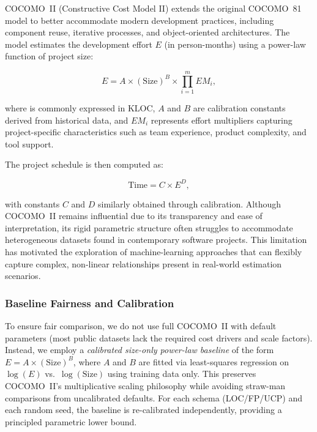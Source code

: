 \documentclass[11pt,a4paper]{article}
\begin{document}
COCOMO~II (Constructive Cost Model II) extends the original COCOMO~81 model to better accommodate modern development practices, including component reuse, iterative processes, and object-oriented architectures. The model estimates the development effort $E$ (in person-months) using a power-law function of project size:

\begin{equation}
E = A \times (\text{Size})^{B} \times \prod_{i=1}^{m} EM_i,
\label{eq:cocomo-effort}
\end{equation}

where  is commonly expressed in KLOC, $A$ and $B$ are calibration constants derived from historical data, and $EM_i$ represents effort multipliers capturing project-specific characteristics such as team experience, product complexity, and tool support.

The project schedule is then computed as:

\begin{equation}
\text{Time} = C \times E^{D},
\label{eq:cocomo-time}
\end{equation}

with constants $C$ and $D$ similarly obtained through calibration. Although COCOMO~II remains influential due to its transparency and ease of interpretation, its rigid parametric structure often struggles to accommodate heterogeneous datasets found in contemporary software projects. This limitation has motivated the exploration of machine-learning approaches that can flexibly capture complex, non-linear relationships present in real-world estimation scenarios.

\subsubsection{Baseline Fairness and Calibration}

To ensure fair comparison, we do not use full COCOMO~II with default parameters (most public datasets lack the required cost drivers and scale factors). Instead, we employ a \textit{calibrated size-only power-law baseline} of the form $E = A \times (\text{Size})^B$, where $A$ and $B$ are fitted via least-squares regression on $\log(E)$ vs.~$\log(\text{Size})$ using training data only. This preserves COCOMO~II's multiplicative scaling philosophy while avoiding straw-man comparisons from uncalibrated defaults. For each schema (LOC/FP/UCP) and each random seed, the baseline is re-calibrated independently, providing a principled parametric lower bound.
\end{document}
